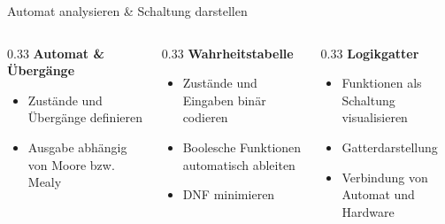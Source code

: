 \begin{contentsframe}{Automat analysieren \& Schaltung darstellen}
\vspace{-1em}

\begin{columns}[T,onlytextwidth]

    \begin{column}{0.33\textwidth}
        \centering
        \textbf{Automat \& Übergänge}

        \vspace{0.5em}

        \raggedright
        \begin{itemize}
            \item Zustände und Übergänge definieren
            \item Ausgabe abhängig von Moore bzw. Mealy
        \end{itemize}
    \end{column}

    \begin{column}{0.33\textwidth}
        \centering
        \textbf{Wahrheitstabelle}

        \vspace{0.5em}

        \raggedright
        \begin{itemize}
            \item Zustände und Eingaben binär codieren
            \item Boolesche Funktionen automatisch ableiten
            \item DNF minimieren
        \end{itemize}
    \end{column}

    \begin{column}{0.33\textwidth}
        \centering
        \textbf{Logikgatter}

        \vspace{0.5em}

        \raggedright
        \begin{itemize}
            \item Funktionen als Schaltung visualisieren
            \item Gatterdarstellung
            \item Verbindung von Automat und Hardware
        \end{itemize}
    \end{column}

\end{columns}


\end{contentsframe}
